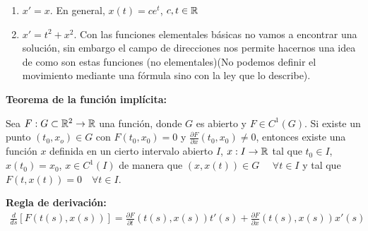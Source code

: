 \begin{ejemplo}
\begin{enumerate}
\begin{center}
        \end{center}
        \item $x'=x$. En general, $x(t)=c e^t$, $c,t\in \mathbb{R}$ %
        \item $x'=t^2+x^2$. Con las funciones elementales básicas no vamos a encontrar una solución, sin embargo el campo de direcciones nos permite hacernos una idea de como son estas funciones (no elementales)(No podemos definir el movimiento mediante una fórmula sino con la ley que lo describe). %

    \end{enumerate}
    \endsquare
\end{ejemplo}

\begin{teo}\textbf{Teorema de la función implícita:}

    Sea $F:G\subset \mathbb{R}^2 \to \mathbb{R}$ una función, donde $G$ es abierto y $F\in C^1(G)$. Si existe un punto $(t_0, x_o)\in G$ con $F(t_0,x_0) = 0$ y $\frac{\partial F}{\partial x}(t_0, x_0)\neq 0$, entonces existe una función $x$ definida en un cierto intervalo abierto $I$, $x: I \to \mathbb{R}$
    tal que $t_0\in I$, $x(t_0)=x_0$, $x\in C ^1(I)$ de manera que $(x,x(t))\in G$ \ \ $\forall t \in I$ y tal que $F(t,x(t)) = 0$\ \ $\forall t \in I$.
    \endsquare
\end{teo}

\textbf{Regla de derivación:}
\begin{gather*}
    \frac{d}{ds} [F(t(s), x(s))] = \frac{\partial F }{\partial t}(t(s), x(s))t'(s) + \frac{\partial F}{\partial x} (t(s), x(s))x'(s)
\end{gather*}

